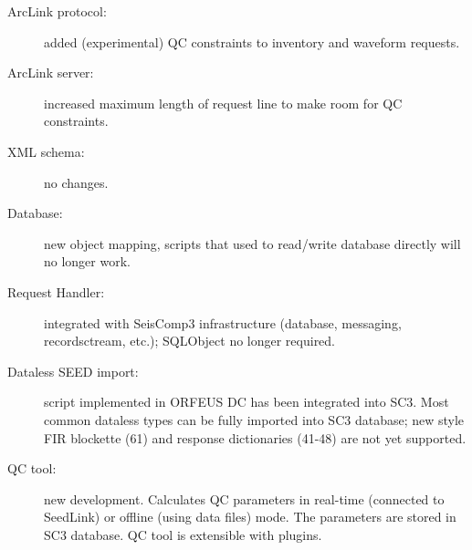 \documentclass[11pt,a4paper,titlepage]{article}
\begin{document}
\begin{description}
    \item[ArcLink protocol:] added (experimental) QC constraints to
    inventory and waveform requests.
    
	\item[ArcLink server:] increased maximum length of request line to make
    room for QC constraints.

    \item[XML schema:] no changes.

    \item[Database:] new object mapping, scripts that used to read/write
    database directly will no longer work.

    \item[Request Handler:] integrated with SeisComp3 infrastructure
    (database, messaging, recordsctream, etc.); SQLObject no longer required.

    \item[Dataless SEED import:] script implemented in ORFEUS DC has been
    integrated into SC3. Most common dataless types can be fully imported
    into SC3 database; new style FIR blockette (61) and response
    dictionaries (41-48) are not yet supported.

    \item[QC tool:] new development. Calculates QC parameters in real-time
    (connected to SeedLink) or offline (using data files) mode. The
    parameters are stored in SC3 database. QC tool is extensible with
    plugins.
\end{description}
\end{document}
